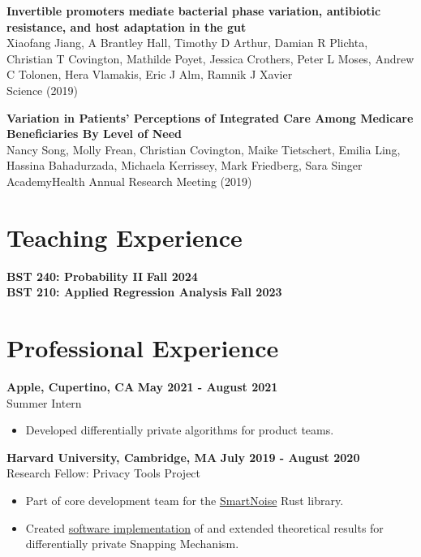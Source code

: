 \documentclass[margin,line]{res}
\begin{document}
\begin{resume}
\textbf{Invertible promoters mediate bacterial phase variation, antibiotic resistance, and host adaptation in the gut} \\
Xiaofang Jiang, A Brantley Hall, Timothy D Arthur, Damian R Plichta, Christian T Covington, Mathilde Poyet, Jessica Crothers, Peter L Moses, Andrew C Tolonen, Hera Vlamakis, Eric J Alm, Ramnik J Xavier \\
Science (2019)

\textbf{Variation in Patients’ Perceptions of Integrated Care Among Medicare Beneficiaries By Level of Need} \\ 
Nancy Song, Molly Frean, Christian Covington, Maike Tietschert, Emilia Ling, Hassina Bahadurzada, Michaela Kerrissey, Mark Friedberg, Sara Singer \\
AcademyHealth Annual Research Meeting (2019)

\section{\sc Teaching Experience}

\textbf{BST 240: Probability II} \hfill \textbf{Fall 2024} \\
\textbf{BST 210: Applied Regression Analysis} \hfill \textbf{Fall 2023}

\section{\sc Professional Experience}
\textbf{Apple, Cupertino, CA} \hfill \textbf{May 2021 - August 2021} \\
Summer Intern \\ 
\begin{itemize} 
    \item Developed differentially private algorithms for product teams.
\end{itemize}

\textbf{Harvard University, Cambridge, MA} \hfill \textbf{July 2019 - August 2020} \\ 
Research Fellow: Privacy Tools Project \\
\begin{itemize}
  \item Part of core development team for the \href{https://github.com/opendifferentialprivacy/smartnoise-core}{SmartNoise} Rust library.
  \item Created \href{https://github.com/ctcovington/floating_point}{software implementation} of and extended theoretical results for differentially private Snapping Mechanism. 
\end{itemize}


\end{resume}
\end{document}
